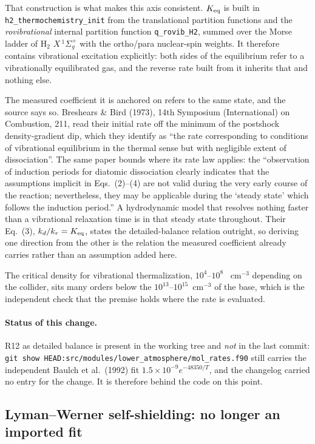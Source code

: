\documentclass[english,a4paper]{my_memo}
\begin{document}
That construction is what makes this axis consistent. $K_{\rm eq}$ is built in
\texttt{h2\_thermochemistry\_init} from the translational partition functions
and the \emph{rovibrational} internal partition function \texttt{q\_rovib\_H2},
summed over the Morse ladder of H$_2$ $X\,^1\Sigma_g^+$ with the ortho/para
nuclear-spin weights. It therefore contains vibrational excitation explicitly:
both sides of the equilibrium refer to a vibrationally equilibrated gas, and
the reverse rate built from it inherits that and nothing else.

The measured coefficient it is anchored on refers to the same state, and the
source says so. Breshears \& Bird (1973), 14th Symposium (International) on
Combustion, 211, read their initial rate off the minimum of the postshock
density-gradient dip, which they identify as ``the rate corresponding to
conditions of vibrational equilibrium in the thermal sense but with negligible
extent of dissociation''. The same paper bounds where its rate law applies:
the ``observation of induction periods for diatomic dissociation clearly
indicates that the assumptions implicit in Eqs.\ (2)--(4) are not valid during
the very early course of the reaction; nevertheless, they may be applicable
during the `steady state' which follows the induction period.'' A
hydrodynamic model that resolves nothing faster than a vibrational relaxation
time is in that steady state throughout. Their Eq.\ (3), $k_d/k_r = K_{\rm
eq}$, states the detailed-balance relation outright, so deriving one direction
from the other is the relation the measured coefficient already carries rather
than an assumption added here.

The critical density for vibrational thermalization, $10^{4}$--$10^{8}$~
cm$^{-3}$ depending on the collider, sits many orders below the
$10^{13}$--$10^{15}$~cm$^{-3}$ of the base, which is the independent check
that the premise holds where the rate is evaluated.

\paragraph{Status of this change.} R12 as detailed balance is present in the
working tree and \emph{not} in the last commit: \texttt{git show
HEAD:src/modules/lower\_atmosphere/mol\_rates.f90} still carries the
independent Baulch et al.\ (1992) fit $1.5\times10^{-9}e^{-48350/T}$, and
the changelog carried no entry for the
change. It is therefore behind the code on this point.

\subsection{Lyman--Werner self-shielding: no longer an imported fit}
\label{sec:lw}
\end{document}
